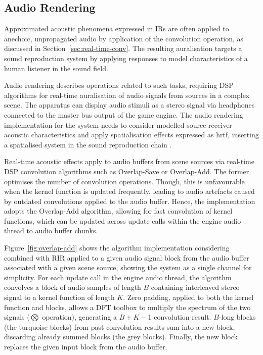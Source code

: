 \subsection{Audio Rendering}
Approximated acoustic phenomena expressed in IRs are often applied to anechoic, unpropagated audio by application of the convolution operation, as discussed in Section~\ref{sec:real-time-conv}. The resulting auralisation targets a sound reproduction system by applying responses to model characteristics of a human listener in the sound field.\par
Audio rendering describes operations related to such tasks, requiring DSP algorithms for real-time auralisation of audio signals from sources in a complex scene. The apparatus can display audio stimuli as a stereo signal via headphones connected to the master bus output of the game engine. The audio rendering implementation for the system needs to consider modelled source-receiver acoustic characteristics and apply spatialisation effects expressed as \acrshort{hrtf}, inserting a spatialised system in the sound reproduction chain \citep{liu2022sound}.\par
Real-time acoustic effects apply to audio buffers from scene sources via real-time DSP convolution algorithms such as Overlap-Save or Overlap-Add. The former optimises the number of convolution operations. Though, this is unfavourable when the kernel function is updated frequently, leading to audio artefacts caused by outdated convolutions applied to the audio buffer. Hence, the implementation adopts the Overlap-Add algorithm, allowing for fast convolution of kernel functions, which can be updated across update calls within the engine audio thread to audio buffer chunks.\par
Figure~\ref{fig:overlap-add} shows the algorithm implementation considering  combined with RIR applied to a given audio signal block from the audio buffer associated with a given scene source, showing the system as a single channel for simplicity. For each update call in the engine audio thread, the algorithm convolves a block of audio samples of length $B$ containing interleaved stereo signal to a kernel function of length $K$. Zero padding, applied to both the kernel function and blocks, allows a DFT toolbox to multiply the spectrum of the two signals ($\bigotimes$ operation), generating a $B+K-1$ convolution result. $B$-long blocks (the turquoise blocks) from past convolution results sum into a new block, discarding already summed blocks (the grey blocks). Finally, the new block replaces the given input block from the audio buffer.\par

